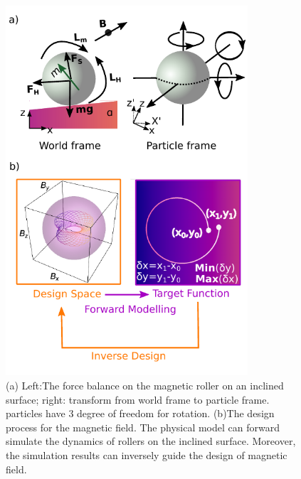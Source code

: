 \begin{figure}[p]
\centering
\includegraphics[width=9cm]{figures/5_2.pdf}
\caption{ (a) Left:The force balance on the magnetic roller on an inclined surface; right: transform from world frame to particle frame. particles have 3 degree of freedom for rotation. (b)The design process for the magnetic field. The physical model can forward simulate the dynamics of rollers on the inclined surface. Moreover, the simulation results can inversely guide the design of magnetic field.}
\label{fig:1}
\end{figure}
